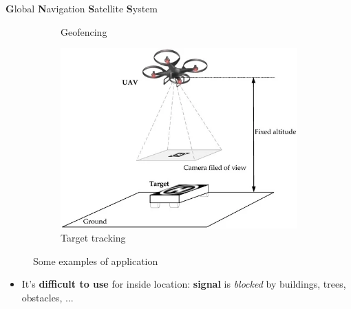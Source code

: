 \begin{frame}{\textbf{G}lobal \textbf{N}avigation \textbf{S}atellite \textbf{S}ystem}
\begin{figure}[!htb]
\begin{subfigure}[b]{0.3\textwidth}
            \caption{Geofencing}
            \label{fig:geofencing}
        \end{subfigure}
        \hfill
        \begin{subfigure}[b]{0.3\textwidth}
            \centering
            \includegraphics[width=\linewidth]{images/target.jpg}
            \caption{Target tracking}
            \label{fig:target}
        \end{subfigure}
           \caption{Some examples of application}
           \label{gnss}
    \end{figure}
    \pause
    \begin{itemize}   
        \item It's \textbf{difficult to use} for inside location: \textbf{signal} is \textit{blocked} by buildings, trees, obstacles, ...
    \end{itemize}
\end{frame}

